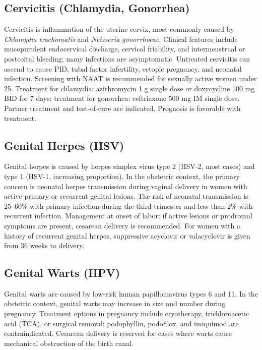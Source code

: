 \subsection{Cervicitis (Chlamydia, Gonorrhea)}
\label{sec:Cervicitis}
Cervicitis is inflammation of the uterine cervix, most commonly caused by \textit{Chlamydia trachomatis} and \textit{Neisseria gonorrhoeae}. Clinical features include mucopurulent endocervical discharge, cervical friability, and intermenstrual or postcoital bleeding; many infections are asymptomatic. Untreated cervicitis can ascend to cause PID, tubal factor infertility, ectopic pregnancy, and neonatal infection. Screening with NAAT is recommended for sexually active women under 25. Treatment for chlamydia: azithromycin 1 g single dose or doxycycline 100 mg BID for 7 days; treatment for gonorrhea: ceftriaxone 500 mg IM single dose. Partner treatment and test-of-cure are indicated. Prognosis is favorable with treatment.

\subsection{Genital Herpes (HSV)}
\label{sec:Genital Herpes}
Genital herpes is caused by herpes simplex virus type 2 (HSV-2, most cases) and type 1 (HSV-1, increasing proportion). In the obstetric context, the primary concern is neonatal herpes transmission during vaginal delivery in women with active primary or recurrent genital lesions. The risk of neonatal transmission is 25--60\% with primary infection during the third trimester and less than 2\% with recurrent infection. Management at onset of labor: if active lesions or prodromal symptoms are present, cesarean delivery is recommended. For women with a history of recurrent genital herpes, suppressive acyclovir or valacyclovir is given from 36 weeks to delivery.

\subsection{Genital Warts (HPV)}
\label{sec:Genital Warts}
Genital warts are caused by low-risk human papillomavirus types 6 and 11. In the obstetric context, genital warts may increase in size and number during pregnancy. Treatment options in pregnancy include cryotherapy, trichloroacetic acid (TCA), or surgical removal; podophyllin, podofilox, and imiquimod are contraindicated. Cesarean delivery is reserved for cases where warts cause mechanical obstruction of the birth canal.

